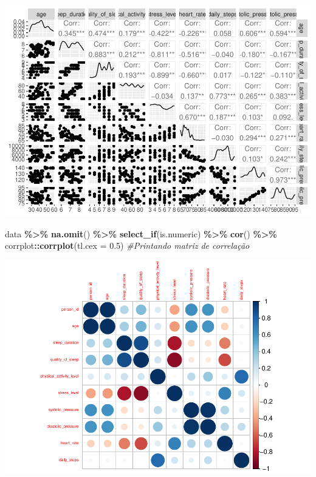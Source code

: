 \documentclass[
]{article}
\newenvironment{Shaded}{\begin{snugshade}}{\end{snugshade}}
\newcommand{\AttributeTok}[1]{\textcolor[rgb]{0.13,0.29,0.53}{#1}}
\newcommand{\CommentTok}[1]{\textcolor[rgb]{0.56,0.35,0.01}{\textit{#1}}}
\newcommand{\FloatTok}[1]{\textcolor[rgb]{0.00,0.00,0.81}{#1}}
\newcommand{\FunctionTok}[1]{\textcolor[rgb]{0.13,0.29,0.53}{\textbf{#1}}}
\newcommand{\NormalTok}[1]{#1}
\newcommand{\SpecialCharTok}[1]{\textcolor[rgb]{0.81,0.36,0.00}{\textbf{#1}}}
\begin{document}
\begin{center}\includegraphics[width=0.6\linewidth]{projeto_files/figure-latex/pt. 2 -1} \end{center}

\begin{Shaded}
\begin{Highlighting}[]
\NormalTok{data }\SpecialCharTok{\%\textgreater{}\%} \FunctionTok{na.omit}\NormalTok{() }\SpecialCharTok{\%\textgreater{}\%} \FunctionTok{select\_if}\NormalTok{(is.numeric) }\SpecialCharTok{\%\textgreater{}\%} \FunctionTok{cor}\NormalTok{() }\SpecialCharTok{\%\textgreater{}\%}\NormalTok{ corrplot}\SpecialCharTok{::}\FunctionTok{corrplot}\NormalTok{(}\AttributeTok{tl.cex =} \FloatTok{0.5}\NormalTok{) }\CommentTok{\#Printando matriz de correlação}
\end{Highlighting}
\end{Shaded}

\begin{center}\includegraphics[width=0.6\linewidth]{projeto_files/figure-latex/pt. 2 -2} \end{center}
\end{document}
